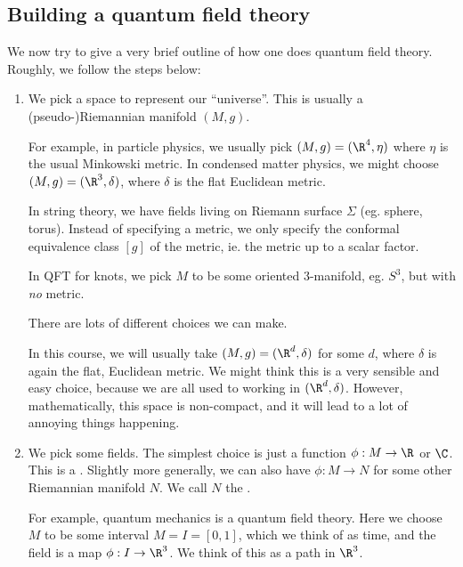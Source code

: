 \documentclass[a4paper]{article}
\begin{document}
\subsection{Building a quantum field theory}
We now try to give a very brief outline of how one does quantum field theory. Roughly, we follow the steps below:
\begin{enumerate}
  \item We pick a space to represent our ``universe''. This is usually a (pseudo-)Riemannian manifold $(M, g)$.

    For example, in particle physics, we usually pick $(M, g) = (\R^4, \eta)$ where $\eta$ is the usual Minkowski metric. In condensed matter physics, we might choose $(M, g) = (\R^3, \delta)$, where $\delta$ is the flat Euclidean metric.

    In string theory, we have fields living on Riemann surface $\Sigma$ (eg. sphere, torus). Instead of specifying a metric, we only specify the conformal equivalence class $[g]$ of the metric, ie. the metric up to a scalar factor.

    In QFT for knots, we pick $M$ to be some oriented $3$-manifold, eg. $S^3$, but with \emph{no} metric.

    There are lots of different choices we can make.

    In this course, we will usually take $(M, g) = (\R^d, \delta)$ for some $d$, where $\delta$ is again the flat, Euclidean metric. We might think this is a very sensible and easy choice, because we are all used to working in $(\R^d, \delta)$. However, mathematically, this space is non-compact, and it will lead to a lot of annoying things happening.

  \item We pick some fields. The simplest choice is just a function $\phi: M \to \R$ or $\C$. This is a . Slightly more generally, we can also have $\phi: M \to N$ for some other Riemannian manifold $N$. We call $N$ the .

    For example, quantum mechanics is a quantum field theory. Here we choose $M$ to be some interval $M = I = [0, 1]$, which we think of as time, and the field is a map $\phi: I \to \R^3$. We think of this as a path in $\R^3$.
    \begin{center}
\end{center}
\end{enumerate}
\end{document}
